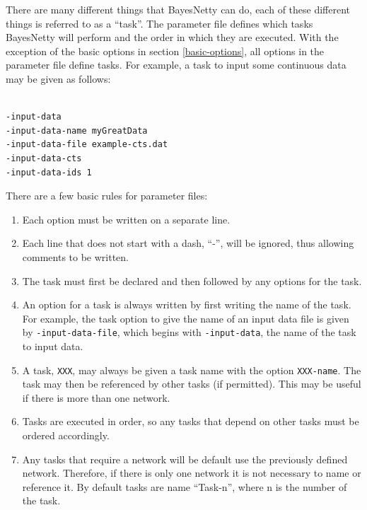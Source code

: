 \documentclass[a4paper,12pt]{article}
\newcommand{\code}[1]{{\footnotesize{{\tt #1}}}}
\begin{document}
There are many different things that BayesNetty can do, each of these different things is referred to as a ``task''. The parameter file defines which tasks BayesNetty will perform and the order in which they are executed. With the exception of the basic options in  section \ref{basic-options}, all options in the parameter file define tasks. For example, a task to input some continuous data may be given as follows: 
\vspace{0.35cm} \begin{lstlisting}

-input-data
-input-data-name myGreatData
-input-data-file example-cts.dat
-input-data-cts
-input-data-ids 1

\end{lstlisting} \vspace{0.35cm}
There are a few basic rules for parameter files: 
\begin{enumerate}

\item Each option must be written on a separate line. 
\item Each line that does not start with a dash, ``-'', will be ignored, thus allowing comments to be written. 
\item The task must first be declared and then followed by any options for the task. 
\item An option for a task is always written by first writing the name of the task. For example, the task option to give the name of an input data file is given by \code{-input-data-file}, which begins with \code{-input-data}, the name of the task to input data. 
\item A task, \code{XXX}, may always be given a task name with the option \code{XXX-name}. The task may then be referenced by other tasks (if permitted). This may be useful if there is more than one network. 
\item Tasks are executed in order, so any tasks that depend on other tasks must be ordered accordingly. 
\item Any tasks that require a network will be default use the previously defined network. Therefore, if there is only one network it is not necessary to name or reference it. By default tasks are name ``Task-n'', where n is the number of the task.\end{enumerate}
\end{document}
